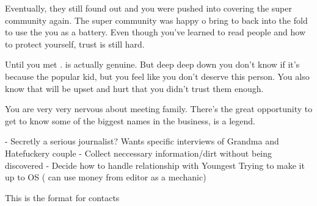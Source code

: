 \documentclass[char]{LRSguildcamp1}
\begin{document}
Eventually, they still found out and you were pushed into covering the super community again. The super community was happy o bring to back into the fold to use the you as a battery. Even though you've learned to read people and how to protect yourself, trust is still hard. 

Until you met \cYoungest{}. \cYoungest{} is actually genuine. But deep deep down you don't know if it’s because \cYoungest{}  the popular kid, but you feel like you don't deserve this person. You also know that \cYoungest{} will be upset and hurt that you didn’t trust them enough. 

You are very very nervous about meeting \cYoungest{} family. There’s the great opportunity to get to know some of the biggest names in the business, \cGrandma{} is a legend. 



\begin{itemz}[Goals]
	\item 
\end{itemz}

\begin{itemz}[Notes]
	\item 
	- Secretly a serious journalist?  Wants specific interviews of Grandma and Hatefuckery couple 
	- Collect neccessary information/dirt without being discovered
	- Decide how to handle relationship with Youngest 
	Trying to make it up to OS ( can use money from editor as a mechanic)
	
\end{itemz}

\begin{contacts}
	\contact{} This is the format for contacts 
\end{contacts}
\end{document}
